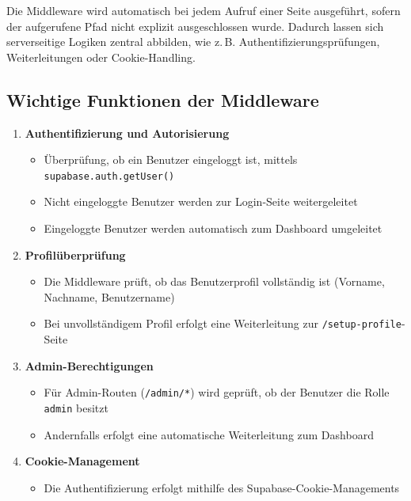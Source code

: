 \begin{inhalt}
\newpage

Die Middleware wird automatisch bei jedem Aufruf einer Seite ausgeführt, sofern der aufgerufene Pfad nicht explizit ausgeschlossen wurde.  
Dadurch lassen sich serverseitige Logiken zentral abbilden, wie z.\,B. Authentifizierungsprüfungen, Weiterleitungen oder Cookie-Handling.

\subsection*{Wichtige Funktionen der Middleware}

\begin{enumerate}[label=\textbf{\arabic*.}]
  \item \textbf{Authentifizierung und Autorisierung}
  \begin{itemize}
    \item Überprüfung, ob ein Benutzer eingeloggt ist, mittels \texttt{supabase.auth.getUser()}
    \item Nicht eingeloggte Benutzer werden zur Login-Seite weitergeleitet
    \item Eingeloggte Benutzer werden automatisch zum Dashboard umgeleitet
  \end{itemize}

  \item \textbf{Profilüberprüfung}
  \begin{itemize}
    \item Die Middleware prüft, ob das Benutzerprofil vollständig ist (Vorname, Nachname, Benutzername)
    \item Bei unvollständigem Profil erfolgt eine Weiterleitung zur \texttt{/setup-profile}-Seite
  \end{itemize}

  \item \textbf{Admin-Berechtigungen}
  \begin{itemize}
    \item Für Admin-Routen (\texttt{/admin/*}) wird geprüft, ob der Benutzer die Rolle \texttt{admin} besitzt
    \item Andernfalls erfolgt eine automatische Weiterleitung zum Dashboard
  \end{itemize}

  \item \textbf{Cookie-Management}
  \begin{itemize}
    \item Die Authentifizierung erfolgt mithilfe des Supabase-Cookie-Managements
  \end{itemize}


\end{enumerate}
\end{inhalt}
